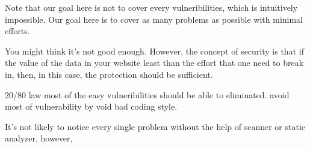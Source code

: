 \documentclass[conference]{IEEEtran}
\begin{document}
Note that our goal here is not to cover every vulneribilities, which is intuitively impossible. Our goal here is to cover as many problems as possible with minimal efforts.

You might think it's not good enough. However, the concept of security is that if the value of the data in your website least than the effort that one need to break in, then, in this case, the protection should be sufficient.

20/80 law most of the easy vulneribilities should be able to eliminated. avoid most of vulnerability by void bad coding style.

It's not likely to notice every single problem without the help of scanner or static analyzer, however,





\end{document}
